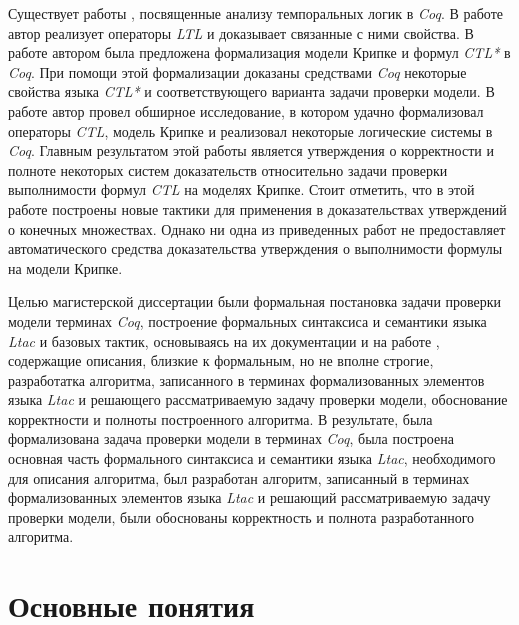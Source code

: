 \documentclass[12pt]{article}
\begin{document}
Существует работы \cite{2007}\cite{thesis}\cite{2003}, посвященные анализу темпоральных логик в \textit{Coq}.
В работе \cite{2003} автор реализует операторы \textit{LTL} и доказывает связанные с ними свойства. 
В работе \cite{2007} автором была предложена формализация модели Крипке и формул \textit{CTL*} в \textit{Coq}. При помощи этой формализации доказаны средствами \textit{Coq} некоторые свойства языка \textit{CTL*} и соответствующего варианта задачи проверки модели. 
В работе \cite{thesis} автор провел обширное исследование, в котором удачно формализовал операторы \textit{CTL}, модель Крипке и реализовал некоторые логические системы в \textit{Coq}. Главным результатом этой работы является утверждения о корректности и полноте некоторых систем доказательств относительно задачи проверки выполнимости формул \textit{CTL} на моделях Крипке. 
Стоит отметить, что в этой работе построены новые тактики для применения в доказательствах утверждений о конечных множествах. Однако ни одна из приведенных работ не предоставляет автоматического средства доказательства утверждения о выполнимости формулы на модели Крипке.

Целью магистерской диссертации были формальная постановка задачи проверки модели терминах \textit{Coq}, построение формальных синтаксиса и семантики языка \textit{Ltac} и базовых тактик, основываясь на их документации \cite{Ltac} и на работе \cite{LtacRef}, содержащие описания, близкие к формальным, но не вполне строгие, разработатка алгоритма, записанного в терминах формализованных элементов языка \textit{Ltac} и решающего рассматриваемую задачу проверки модели, обоснование корректности и полноты построенного алгоритма.
В результате, была формализована задача проверки модели в терминах \textit{Coq}, была построена основная часть формального синтаксиса и семантики языка \textit{Ltac}, необходимого для описания алгоритма, был разработан алгоритм, записанный в терминах формализованных элементов языка \textit{Ltac} и решающий рассматриваемую задачу проверки модели, были обоснованы корректность и полнота разработанного алгоритма.
  
  \section{Основные понятия}
  
\end{document}
